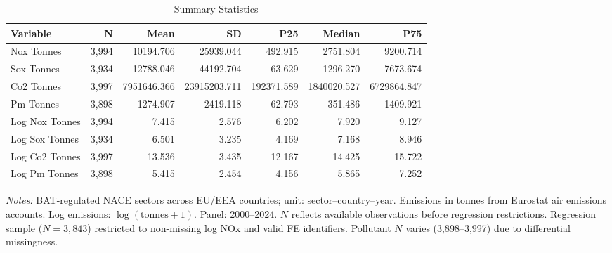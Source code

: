 \begin{table}[H]
\centering
\caption{Summary Statistics}
\label{tab:summary}
\begin{adjustbox}{max width=\textwidth}
\begin{tabular}{lrrrrrr}
\toprule
Variable & N & Mean & SD & P25 & Median & P75 \\
\midrule
Nox Tonnes & 3,994 & 10194.706 & 25939.044 & 492.915 & 2751.804 & 9200.714 \\
Sox Tonnes & 3,934 & 12788.046 & 44192.704 & 63.629 & 1296.270 & 7673.674 \\
Co2 Tonnes & 3,997 & 7951646.366 & 23915203.711 & 192371.589 & 1840020.527 & 6729864.847 \\
Pm Tonnes & 3,898 & 1274.907 & 2419.118 & 62.793 & 351.486 & 1409.921 \\
Log Nox Tonnes & 3,994 & 7.415 & 2.576 & 6.202 & 7.920 & 9.127 \\
Log Sox Tonnes & 3,934 & 6.501 & 3.235 & 4.169 & 7.168 & 8.946 \\
Log Co2 Tonnes & 3,997 & 13.536 & 3.435 & 12.167 & 14.425 & 15.722 \\
Log Pm Tonnes & 3,898 & 5.415 & 2.454 & 4.156 & 5.865 & 7.252 \\
\bottomrule
\end{tabular}
\end{adjustbox}
\par\vspace{0.3em}
{\footnotesize \emph{Notes:} BAT-regulated NACE sectors across EU/EEA countries; unit: sector--country--year. Emissions in tonnes from Eurostat air emissions accounts. Log emissions: $\log(\text{tonnes}+1)$. Panel: 2000--2024. $N$ reflects available observations before regression restrictions. Regression sample ($N=3{,}843$) restricted to non-missing log NOx and valid FE identifiers. Pollutant $N$ varies (3,898--3,997) due to differential missingness.}
\end{table}
